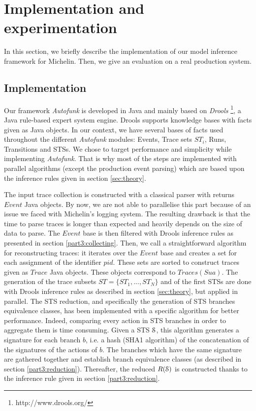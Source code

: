 
\section{Implementation and experimentation}
\label{sec:impl-exp}

In this section, we briefly describe the implementation of our
model inference framework for Michelin. Then, we give an
evaluation on a real production system.

\subsection{Implementation}
\label{sec:impl-exp-collect}

Our framework \textit{Autofunk} is developed in Java and mainly
based on \textit{Drools} \footnote{http://www.drools.org/}, a
Java rule-based expert system engine. Drools supports knowledge
bases with facts given as Java objects. In our context, we have
several bases of facts used throughout the different
\textit{Autofunk} modules: Events, Trace sets $ST_i$, Runs,
Transitions and STSs.
We chose to target performance and simplicity while implementing
\textit{Autofunk}. That is why most of the steps are implemented
with parallel algorithms (except the production event parsing)
which are based upon the inference rules given in section
\ref{sec:theory}.

The input trace collection is constructed with a classical parser with returns
$Event$ Java objects. By now, we are not able to parallelise
this part because of an issue we faced with Michelin's logging
system. The resulting drawback is that the time to parse traces
is longer than expected and heavily depends on the size of data
to parse. The $Event$ base is then filtered with Drools
inference rules as presented in section \ref{part3:collecting}.
Then, we call a straightforward algorithm for reconstructing
traces: it iterates over the $Event$ base and creates a
set for each assignment of the identifier $pid$. These sets
are sorted to construct traces given as $Trace$ Java
objects. These objects correspond to $Traces(Sua)$. The
generation of the trace subsets $ST= \{ST_1,...,ST_N\}$ and of
the first STSs are done with Drools inference rules as described
in section \ref{sec:theory}, but applied in parallel. The STS
reduction, and specifically the generation of STS branches
equivalence classes, has been implemented with a specific
algorithm for better performance. Indeed, comparing every action
in STS branches in order to aggregate them is time consuming.
Given a STS $\EuScript{S}$, this algorithm generates a signature
for each branch $b$, i.e. a hash (SHA1 algorithm) of the
concatenation of the signatures of the actions of $b$. The
branches which have the same signature are gathered together and
establish branch equivalence classes (as described in section
\ref{part3:reduction}). Thereafter, the reduced $R(\EuScript{S})$
is constructed thanks to the inference rule given in section
\ref{part3:reduction}.

